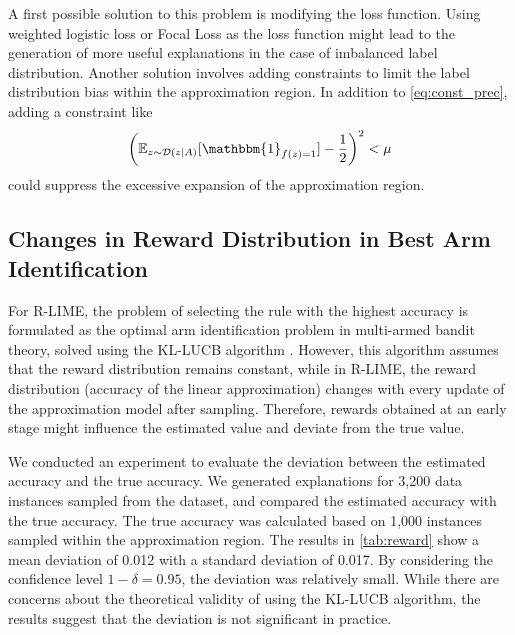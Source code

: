 \documentclass[11pt]{article}
\begin{document}
A first possible solution to this problem is modifying the loss function.
Using weighted logistic loss or Focal Loss \cite{lin2020focal}
as the loss function might lead to the generation of more useful explanations
in the case of imbalanced label distribution.
Another solution involves adding constraints
to limit the label distribution bias within the approximation region.
In addition to \cref{eq:const_prec}, adding a constraint like
\begin{equation}
  {%
    \left(
    \mathbb{E}_{z\sim\mathcal{D}(z\mid A)}[\mathbbm{1}_{f(z)=1}]-\frac{1}{2}
    \right)
  }^2<\mu
\end{equation}
could suppress the excessive expansion of the approximation region.

\subsection{Changes in Reward Distribution in Best Arm Identification}\label{sec:reward}
{%
  \renewcommand{\arraystretch}{1.1}
  \begin{table}[tbp]
    \centering
    \caption[Deviation between the estimated accuracy and the true accuracy]{%
      Deviation between the estimated accuracy and the true accuracy.
      Deviation was relatively small considering confidence level $1-\delta=0.95$.
    }\label{tab:reward}
    
  \end{table}
}
For R-LIME,
the problem of selecting the rule with the highest accuracy is formulated
as the optimal arm identification problem in multi-armed bandit theory,
solved using the KL-LUCB algorithm \cite{kaufmann2013information}.
However, this algorithm assumes that the reward distribution remains constant,
while in R-LIME,
the reward distribution (accuracy of the linear approximation)
changes with every update of the approximation model after sampling.
Therefore, rewards obtained at an early stage
might influence the estimated value and deviate from the true value.

We conducted an experiment to evaluate the deviation
between the estimated accuracy and the true accuracy.
We generated explanations for 3,200 data instances sampled from the dataset,
and compared the estimated accuracy with the true accuracy.
The true accuracy was calculated based on 1,000 instances sampled
within the approximation region.
The results in \cref{tab:reward} show a mean deviation of 0.012
with a standard deviation of 0.017.
By considering the confidence level $1-\delta=0.95$,
the deviation was relatively small.
While there are concerns about the theoretical validity of using the KL-LUCB algorithm,
the results suggest that the deviation is not significant in practice.
\end{document}
